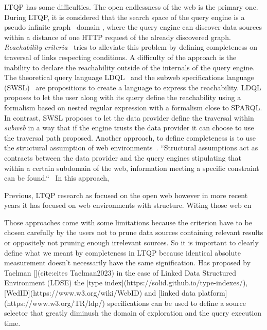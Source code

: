 \iffalse
LTQP has some difficulties.
The open endlessness of the web is the primary one.
During LTQP, it is considered that the search space of the query engine is a pseudo infinite graph~ domain , where the query engine can discover data sources within a distance of one HTTP request of the already discovered graph.
\emph{Reachability criteria}~\cite{Hartig2012} tries to alleviate this problem by defining completeness on traversal of links respecting conditions.
A difficulty of the approach is the inability to declare the reachability outside of the internals of the query engine.
The theoretical query language LDQL~\cite{hartigLDQL} and the subweb specifications language (SWSL)~\cite{Bogaerts2021LinkTW} are propositions to create a language to express the reachability.
LDQL proposes to let the user along with its query define the reachability using a formalism based on nested regular expression with a formalism close to SPARQL. 
In contrast, SWSL proposes to let the data provider define the traversal within \emph{subweb} in a way that if the engine trusts the data provider it can choose to use the traversal path proposed.
Another approach, to define completeness is to use the structural assumption of web environments~\cite{Taelman2023}.
``Structural assumptions act as contracts between the data provider and the query engines stipulating that within a certain subdomain of the web, information meeting a specific constraint can be found.``~\cite{tam2024opportunitiesshapebasedoptimizationlink}
In this approach,


Previous, LTQP research as focused on the open web however in more recent years it has focused on web environments with structure.
Witing those web en

Those approaches come with some limitations because the criterion have to be chosen carefully by the users not to prune data sources containing relevant results or oppositely
not pruning enough irrelevant sources.
So it is important to clearly define what we meant by completeness in LTQP because identical absolute measurement doesn't necessarily have the same signification. 
Has proposed by Taelman [](cite:cites Taelman2023) in the case of Linked Data Structured Environment (LDSE) the [type index](https://solid.github.io/type-indexes/),
[WedID](https://www.w3.org/wiki/WebID) and [linked data platform](https://www.w3.org/TR/ldp/)
specifications can be used to define a source selector that greatly diminush the domain of exploration and the query execution time.

